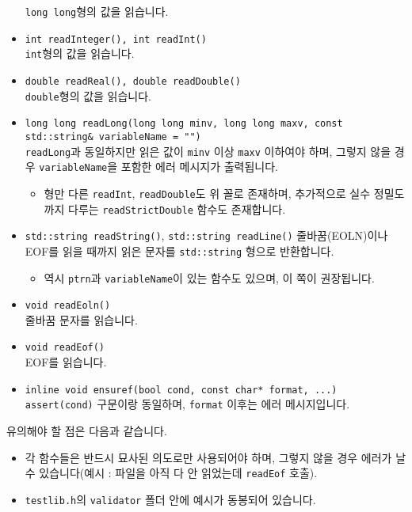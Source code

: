 \documentclass{article}
\begin{document}
\begin{itemize}
        \verb|long long|형의 값을 읽습니다.
        \item \verb|int readInteger(), int readInt()|\\
        \verb|int|형의 값을 읽습니다.
        \item \verb|double readReal(), double readDouble()|\\
        \verb|double|형의 값을 읽습니다.
        \item \verb|long long readLong(long long minv, long long maxv, const std::string& variableName = "")|\\
        \verb|readLong|과 동일하지만 읽은 값이 \verb|minv| 이상 \verb|maxv| 이하여야 하며, 그렇지 않을 경우 \verb|variableName|을 포함한 에러 메시지가 출력됩니다.
        \begin{itemize}
            \item 형만 다른 \verb|readInt|, \verb|readDouble|도 위 꼴로 존재하며, 추가적으로 실수 정밀도까지 다루는 \verb|readStrictDouble| 함수도 존재합니다.
        \end{itemize}
        \item \verb|std::string readString()|, \verb|std::string readLine()|
       줄바꿈(EOLN)이나 EOF를 읽을 때까지 읽은 문자를 \verb|std::string| 형으로 반환합니다.
       \begin{itemize}
           \item 역시 \verb|ptrn|과 \verb|variableName|이 있는 함수도 있으며, 이 쪽이 권장됩니다.
       \end{itemize}
       \item \verb|void readEoln()|\\
       줄바꿈 문자를 읽습니다.
       \item \verb|void readEof()|\\
       EOF를 읽습니다.
       \item \verb|inline void ensuref(bool cond, const char* format, ...)|\\
       \verb|assert(cond)| 구문이랑 동일하며, \verb|format| 이후는 에러 메시지입니다.
    \end{itemize}
    유의해야 할 점은 다음과 같습니다.
    \begin{itemize}
        \item 각 함수들은 반드시 묘사된 의도로만 사용되어야 하며, 그렇지 않을 경우 에러가 날 수 있습니다(예시 : 파일을 아직 다 안 읽었는데 \verb|readEof| 호출).
        \item \verb|testlib.h|의 \verb|validator| 폴더 안에 예시가 동봉되어 있습니다.
    \end{itemize}
\end{document}
